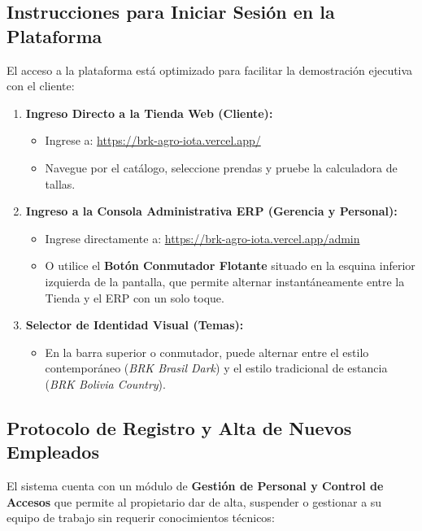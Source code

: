 \documentclass[11pt,a4paper]{article}
\begin{document}
\subsection{Instrucciones para Iniciar Sesión en la Plataforma}

El acceso a la plataforma está optimizado para facilitar la demostración ejecutiva con el cliente:

\begin{propbox}
\begin{enumerate}
    \item \textbf{Ingreso Directo a la Tienda Web (Cliente):}
    \begin{itemize}
        \item Ingrese a: \url{https://brk-agro-iota.vercel.app/}
        \item Navegue por el catálogo, seleccione prendas y pruebe la calculadora de tallas.
    \end{itemize}
    
    \item \textbf{Ingreso a la Consola Administrativa ERP (Gerencia y Personal):}
    \begin{itemize}
        \item Ingrese directamente a: \url{https://brk-agro-iota.vercel.app/admin}
        \item O utilice el \textbf{Botón Conmutador Flotante} situado en la esquina inferior izquierda de la pantalla, que permite alternar instantáneamente entre la Tienda y el ERP con un solo toque.
    \end{itemize}

    \item \textbf{Selector de Identidad Visual (Temas):}
    \begin{itemize}
        \item En la barra superior o conmutador, puede alternar entre el estilo contemporáneo (\textit{BRK Brasil Dark}) y el estilo tradicional de estancia (\textit{BRK Bolivia Country}).
    \end{itemize}
\end{enumerate}
\end{propbox}

\subsection{Protocolo de Registro y Alta de Nuevos Empleados}

El sistema cuenta con un módulo de \textbf{Gestión de Personal y Control de Accesos} que permite al propietario dar de alta, suspender o gestionar a su equipo de trabajo sin requerir conocimientos técnicos:
\end{document}
